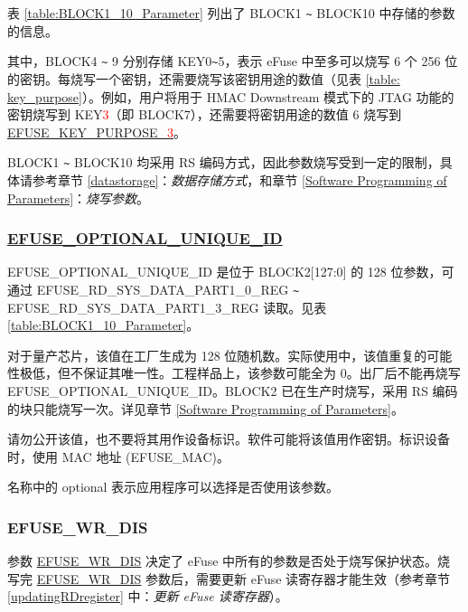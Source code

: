 \documentclass[main\_\_CN.tex]{subfiles}
\begin{document}
表 \ref{table:BLOCK1_10_Parameter} 列出了 BLOCK1 \verb+~+ BLOCK10 中存储的参数的信息。



其中，BLOCK4 \verb+~+ 9 分别存储 KEY0\verb+~+5，表示 eFuse 中至多可以烧写 6 个 256 位的密钥。每烧写一个密钥，还需要烧写该密钥用途的数值（见表 \ref{table: key_purpose}）。例如，用户将用于 HMAC Downstream 模式下的 JTAG 功能的密钥烧写到 KEY\textcolor{red}{3}（即 BLOCK7），还需要将密钥用途的数值 6 烧写到 \hyperref[fielddesc:EFUSEKEYPURPOSE3]{EFUSE\_KEY\_PURPOSE\_\textcolor{red}{3}}。

BLOCK1 \verb+~+ BLOCK10 均采用 RS 编码方式，因此参数烧写受到一定的限制，具体请参考章节 \ref{datastorage}：\textit{数据存储方式}，和章节 \ref{Software Programming of Parameters}：\textit{烧写参数}。

\subsubsection{\texorpdfstring{\hyperref[fielddesc:EFUSEOPTIONALUNIQUEID]{EFUSE\_OPTIONAL\_UNIQUE\_ID}}{EFUSE\_OPTIONAL\_UNIQUE\_ID}}
\label{sec:efuse-optional-unique-id}

EFUSE\_OPTIONAL\_UNIQUE\_ID 是位于 BLOCK2[127:0] 的 128 位参数，可通过 EFUSE\_RD\_SYS\_DATA\_PART1\_0\_REG \verb+~+ EFUSE\_RD\_SYS\_DATA\_PART1\_3\_REG 读取。见表 \ref{table:BLOCK1_10_Parameter}。

对于量产芯片，该值在工厂生成为 128 位随机数。实际使用中，该值重复的可能性极低，但不保证其唯一性。工程样品上，该参数可能全为 0。出厂后不能再烧写 EFUSE\_OPTIONAL\_UNIQUE\_ID。BLOCK2 已在生产时烧写，采用 RS 编码的块只能烧写一次。详见章节 \ref{Software Programming of Parameters}。

请勿公开该值，也不要将其用作设备标识。软件可能将该值用作密钥。标识设备时，使用 MAC 地址 (EFUSE\_MAC)。

名称中的 optional 表示应用程序可以选择是否使用该参数。

\subsubsection{EFUSE\_WR\_DIS}\label{section:EFUSEWRDISABLE}

参数 \hyperref[fielddesc:EFUSEWRDIS]{EFUSE\_WR\_DIS} 决定了 eFuse 中所有的参数是否处于烧写保护状态。烧写完 \hyperref[fielddesc:EFUSEWRDIS]{EFUSE\_WR\_DIS} 参数后，需要更新 eFuse 读寄存器才能生效（参考章节 \ref{updatingRDregister} 中：\textit{更新 eFuse 读寄存器}）。
\end{document}
